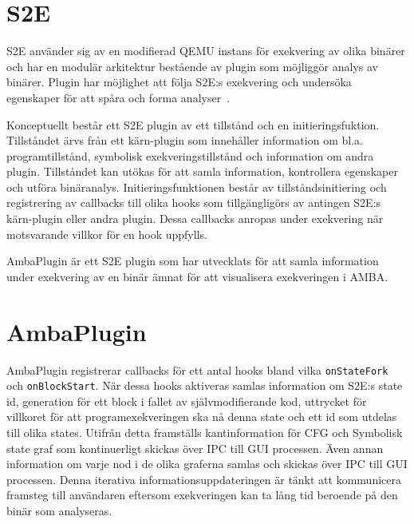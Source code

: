 \section{S2E}
S2E använder sig av en modifierad QEMU instans för exekvering av olika
binärer och har en modulär arkitektur bestående av plugin som
möjliggör analys av binärer. Plugin har möjlighet att följa S2E:s
exekvering och undersöka egenskaper för att spåra och forma
analyser~\cite{Chipounov12}.

Konceptuellt består ett S2E plugin av ett tillstånd och en
initieringsfuktion. Tillståndet ärvs från ett kärn-plugin som
innehåller information om bl.a. programtillstånd, symbolisk
exekveringstillstånd och information om andra plugin. Tillståndet kan
utökas för att samla information, kontrollera egenskaper och utföra
binäranalys. Initieringsfunktionen består av tillståndsinitiering och
registrering av callbacks till olika hooks som tillgängligörs av
antingen S2E:s kärn-plugin eller andra plugin. Dessa callbacks anropas
under exekvering när motsvarande villkor för en hook uppfylls.

AmbaPlugin är ett S2E plugin som har utvecklats för att samla
information under exekvering av en binär ämnat för att visualisera
exekveringen i AMBA.

\section{AmbaPlugin}
AmbaPlugin registrerar callbacks för ett antal hooks bland vilka
\texttt{onStateFork} och \texttt{onBlockStart}.
När dessa hooks aktiveras samlas information om S2E:s state id,
generation för ett block i fallet av självmodifierande kod, uttrycket
för villkoret för att programexekveringen ska nå denna state och ett
id som utdelas till olika states. Utifrån detta framställs
kantinformation för CFG och Symbolisk state graf som kontinuerligt
skickas över IPC till GUI processen. Även annan information om varje
nod i de olika graferna samlas och skickas över IPC till GUI
processen. Denna iterativa informationsuppdateringen är tänkt att
kommunicera framsteg till användaren eftersom exekveringen kan ta lång
tid beroende på den binär som analyseras.


